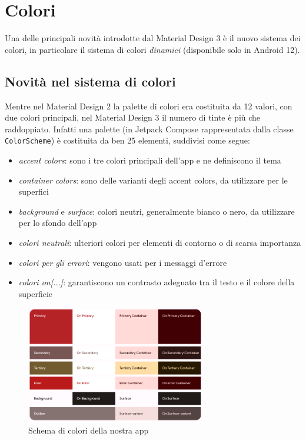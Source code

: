\documentclass[12pt, a4paper]{report}
\begin{document}
	\section{Colori}
	Una delle principali novità introdotte dal Material Design 3 è il nuovo sistema dei colori, in particolare il sistema di colori \textit{dinamici} (disponibile solo in Android 12).
		
		\subsection{Novità nel sistema di colori}
		Mentre nel Material Design 2 la palette di colori era costituita da 12 valori, con due colori principali, nel Material Design 3 il numero di tinte è più che raddoppiato. Infatti una palette (in Jetpack Compose rappresentata dalla classe \texttt{ColorScheme}) è costituita da ben 25 elementi, suddivisi come segue:
		\begin{itemize}
			\item \textit{accent colors}: sono i tre colori principali dell'app e ne definiscono il tema
			\item \textit{container colors}: sono delle varianti degli accent colors, da utilizzare per le superfici
			\item \textit{background} e \textit{surface}: colori neutri, generalmente bianco o nero, da utilizzare per lo sfondo dell'app
			\item \textit{colori neutrali}: ulteriori colori per elementi di contorno o di scarsa importanza
			\item \textit{colori per gli errori}: vengono usati per i messaggi d'errore
			\item \textit{colori on[...]}: garantiscono un contrasto adeguato tra il testo e il colore della superficie
		\end{itemize}
		
		\begin{figure}[h]
   			\centering
   			\includegraphics[width=0.7\textwidth]{MD3colorscheme} %
 			\caption{Schema di colori della nostra app}
		\end{figure}
		
\end{document}
